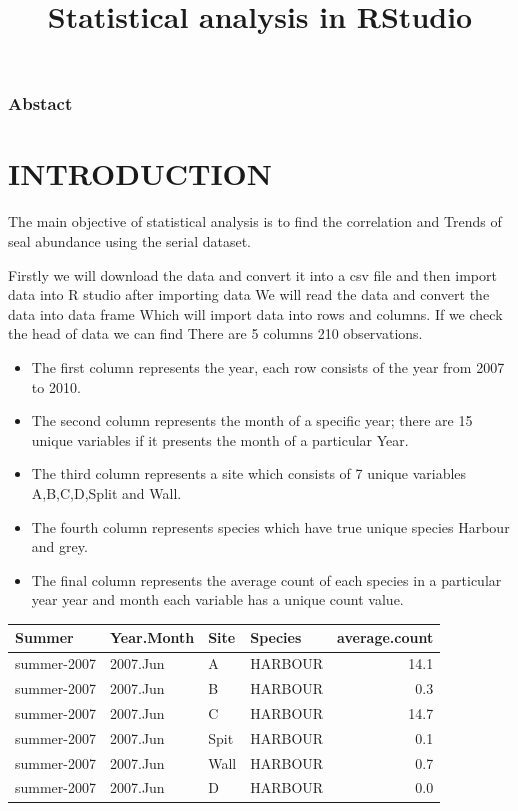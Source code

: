 \documentclass[
]{article}
\title{Statistical analysis in RStudio}
\author{}
\date{\vspace{-2.5em}}
\providecommand{\tightlist}{%
  \setlength{\itemsep}{0pt}\setlength{\parskip}{0pt}}
\begin{document}
\maketitle

{
\setcounter{tocdepth}{2}
\tableofcontents
}
\hypertarget{abstact}{%
\subsubsection{Abstact}\label{abstact}}

\hypertarget{introduction}{%
\section{INTRODUCTION}\label{introduction}}

The main objective of statistical analysis is to find the correlation
and Trends of seal abundance using the serial dataset.

Firstly we will download the data and convert it into a csv file and
then import data into R studio after importing data We will read the
data and convert the data into data frame Which will import data into
rows and columns. If we check the head of data we can find There are 5
columns 210 observations.

\begin{itemize}
\tightlist
\item
  The first column represents the year, each row consists of the year
  from 2007 to 2010.
\item
  The second column represents the month of a specific year; there are
  15 unique variables if it presents the month of a particular Year.
\item
  The third column represents a site which consists of 7 unique
  variables A,B,C,D,Split and Wall.
\item
  The fourth column represents species which have true unique species
  Harbour and grey.
\item
  The final column represents the average count of each species in a
  particular year year and month each variable has a unique count value.
\end{itemize}

\begin{longtable}[]{@{}llllr@{}}
\toprule
Summer & Year.Month & Site & Species & average.count\tabularnewline
\midrule
\endhead
summer-2007 & 2007.Jun & A & HARBOUR & 14.1\tabularnewline
summer-2007 & 2007.Jun & B & HARBOUR & 0.3\tabularnewline
summer-2007 & 2007.Jun & C & HARBOUR & 14.7\tabularnewline
summer-2007 & 2007.Jun & Spit & HARBOUR & 0.1\tabularnewline
summer-2007 & 2007.Jun & Wall & HARBOUR & 0.7\tabularnewline
summer-2007 & 2007.Jun & D & HARBOUR & 0.0\tabularnewline
\bottomrule
\end{longtable}
\end{document}
